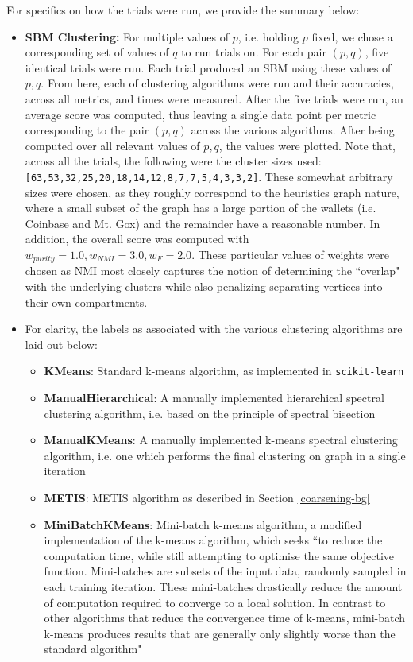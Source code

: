 \documentclass{article}
\begin{document}
For specifics on how the trials were run, we provide the summary below:
\begin{itemize}
    \item \textbf{SBM Clustering:} For multiple values of $p$, i.e. holding $p$ fixed, we chose a corresponding set of values of $q$ to run trials on. For each pair $(p,q)$, five identical trials were run. Each trial produced an SBM using these values of $p,q$. From here, each of clustering algorithms were run and their accuracies, across all metrics, and times were measured. After the five trials were run, an average score was computed, thus leaving a single data point per metric corresponding to the pair $(p,q)$ across the various algorithms. After being computed over all relevant values of $p,q$, the values were plotted. Note that, across all the trials, the following were the cluster sizes used: \texttt{[63,53,32,25,20,18,14,12,8,7,7,5,4,3,3,2]}. These somewhat arbitrary sizes were chosen, as they roughly correspond to the heuristics graph nature, where a small subset of the graph has a large portion of the wallets (i.e. Coinbase and Mt. Gox) and the remainder have a reasonable number. In addition, the overall score was computed with $w_{purity}=1.0,w_{NMI}=3.0,w_{F}=2.0$. These particular values of weights were chosen as NMI most closely captures the notion of determining the ``overlap" with the underlying clusters while also penalizing separating vertices into their own compartments. 
    \item For clarity, the labels as associated with the various clustering algorithms are laid out below:
    \begin{itemize}
        \item \textbf{KMeans}: Standard k-means algorithm, as implemented in \texttt{scikit-learn}
        \item \textbf{ManualHierarchical}: A manually implemented hierarchical spectral clustering algorithm, i.e. based on the principle of spectral bisection
        \item \textbf{ManualKMeans}: A manually implemented k-means spectral clustering algorithm, i.e. one which performs the final clustering on graph in a single iteration
        \item \textbf{METIS}: METIS algorithm as described in Section \ref{coarsening-bg}
        \item \textbf{MiniBatchKMeans}: Mini-batch k-means algorithm, a modified implementation of the k-means algorithm, which seeks ``to reduce the computation time, while still attempting to optimise the same objective function. Mini-batches are subsets of the input data, randomly sampled in each training iteration. These mini-batches drastically reduce the amount of computation required to converge to a local solution. In contrast to other algorithms that reduce the convergence time of k-means, mini-batch k-means produces results that are generally only slightly worse than the standard algorithm" \cite{scikit}

\end{itemize}
\end{itemize}
\end{document}
